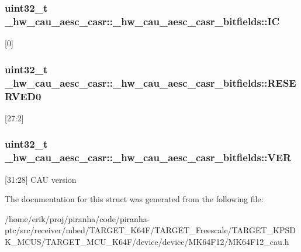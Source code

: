 \subsubsection[{\texorpdfstring{IC}{IC}}]{\setlength{\rightskip}{0pt plus 5cm}uint32\+\_\+t \+\_\+hw\+\_\+cau\+\_\+aesc\+\_\+casr\+::\+\_\+hw\+\_\+cau\+\_\+aesc\+\_\+casr\+\_\+bitfields\+::\+IC}\hypertarget{struct__hw__cau__aesc__casr_1_1__hw__cau__aesc__casr__bitfields_a0dbb649992e4ed2fe9e2b00b398fc6ca}{}\label{struct__hw__cau__aesc__casr_1_1__hw__cau__aesc__casr__bitfields_a0dbb649992e4ed2fe9e2b00b398fc6ca}
\mbox{[}0\mbox{]} 
\subsubsection[{\texorpdfstring{R\+E\+S\+E\+R\+V\+E\+D0}{RESERVED0}}]{\setlength{\rightskip}{0pt plus 5cm}uint32\+\_\+t \+\_\+hw\+\_\+cau\+\_\+aesc\+\_\+casr\+::\+\_\+hw\+\_\+cau\+\_\+aesc\+\_\+casr\+\_\+bitfields\+::\+R\+E\+S\+E\+R\+V\+E\+D0}\hypertarget{struct__hw__cau__aesc__casr_1_1__hw__cau__aesc__casr__bitfields_addb7d0e3716a734718411464b15c6f89}{}\label{struct__hw__cau__aesc__casr_1_1__hw__cau__aesc__casr__bitfields_addb7d0e3716a734718411464b15c6f89}
\mbox{[}27\+:2\mbox{]} 
\subsubsection[{\texorpdfstring{V\+ER}{VER}}]{\setlength{\rightskip}{0pt plus 5cm}uint32\+\_\+t \+\_\+hw\+\_\+cau\+\_\+aesc\+\_\+casr\+::\+\_\+hw\+\_\+cau\+\_\+aesc\+\_\+casr\+\_\+bitfields\+::\+V\+ER}\hypertarget{struct__hw__cau__aesc__casr_1_1__hw__cau__aesc__casr__bitfields_a985b33f63edbf9b42fa57d4a3d86c146}{}\label{struct__hw__cau__aesc__casr_1_1__hw__cau__aesc__casr__bitfields_a985b33f63edbf9b42fa57d4a3d86c146}
\mbox{[}31\+:28\mbox{]} C\+AU version 

The documentation for this struct was generated from the following file\+:\begin{DoxyCompactItemize}
\item 
/home/erik/proj/piranha/code/piranha-\/ptc/src/receiver/mbed/\+T\+A\+R\+G\+E\+T\+\_\+\+K64\+F/\+T\+A\+R\+G\+E\+T\+\_\+\+Freescale/\+T\+A\+R\+G\+E\+T\+\_\+\+K\+P\+S\+D\+K\+\_\+\+M\+C\+U\+S/\+T\+A\+R\+G\+E\+T\+\_\+\+M\+C\+U\+\_\+\+K64\+F/device/device/\+M\+K64\+F12/M\+K64\+F12\+\_\+cau.\+h\end{DoxyCompactItemize}

